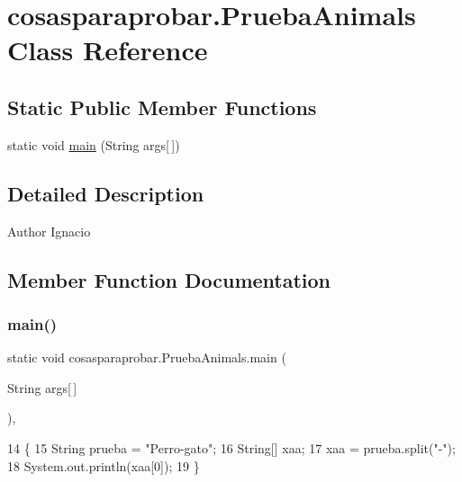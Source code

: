 \hypertarget{classcosasparaprobar_1_1_prueba_animals}{}\section{cosasparaprobar.\+Prueba\+Animals Class Reference}
\label{classcosasparaprobar_1_1_prueba_animals}
\subsection*{Static Public Member Functions}
\begin{DoxyCompactItemize}
\item 
static void \mbox{\hyperlink{classcosasparaprobar_1_1_prueba_animals_a93d843fa55b44c62f968ebe7e4f130e1}{main}} (String args\mbox{[}$\,$\mbox{]})
\end{DoxyCompactItemize}


\subsection{Detailed Description}
\begin{DoxyAuthor}{Author}
Ignacio 
\end{DoxyAuthor}


\subsection{Member Function Documentation}
\mbox{\label{classcosasparaprobar_1_1_prueba_animals_a93d843fa55b44c62f968ebe7e4f130e1}} 
\subsubsection{\texorpdfstring{main()}{main()}}
{\footnotesize\ttfamily static void cosasparaprobar.\+Prueba\+Animals.\+main (\begin{DoxyParamCaption}\item[{String}]{args\mbox{[}$\,$\mbox{]} }\end{DoxyParamCaption})\hspace{0.3cm}{\ttfamily [inline]}, {\ttfamily [static]}}


\begin{DoxyCode}
14     \{
15     String prueba = \textcolor{stringliteral}{"Perro-gato"};
16     String[] xaa;
17     xaa = prueba.split(\textcolor{stringliteral}{"-"});
18     System.out.println(xaa[0]);
19     \}
\end{DoxyCode}
